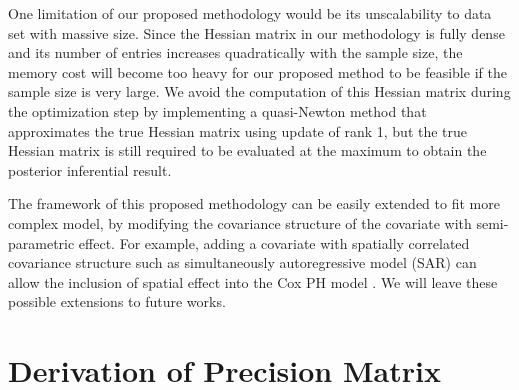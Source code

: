 \documentclass[]{article}
\begin{document}
One limitation of our proposed methodology would be its unscalability to data set with massive size. Since the Hessian matrix in our methodology is fully dense and its number of entries increases quadratically with the sample size, the memory cost will become too heavy for our proposed method to be feasible if the sample size is very large. We avoid the computation of this Hessian matrix during the optimization step by implementing a quasi-Newton method that approximates the true Hessian matrix using update of rank 1, but the true Hessian matrix is still required to be evaluated at the maximum to obtain the posterior inferential result. 

The framework of this proposed methodology can be easily extended to fit more complex model, by modifying the covariance structure of the covariate with semi-parametric effect. For example, adding a covariate with spatially correlated covariance structure such as simultaneously autoregressive model (SAR) can allow the inclusion of spatial effect into the Cox PH model \citep{Spatial}. We will leave these possible extensions to future works.

\newpage




\appendix

\section{Derivation of Precision Matrix}
\end{document}
